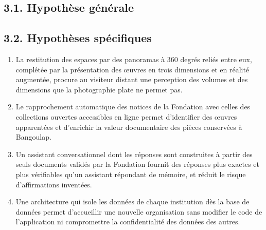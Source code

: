 \subsection*{3.1. Hypothèse générale}


\subsection*{3.2. Hypothèses spécifiques}

\begin{enumerate}
  \item[\textbf{HS1.}] La restitution des espaces par des panoramas à 360 degrés
        reliés entre eux, complétée par la présentation des œuvres en trois
        dimensions et en réalité augmentée, procure au visiteur distant une
        perception des volumes et des dimensions que la photographie plate ne
        permet pas.

  \item[\textbf{HS2.}] Le rapprochement automatique des notices de la Fondation
        avec celles des collections ouvertes accessibles en ligne permet
        d'identifier des œuvres apparentées et d'enrichir la valeur documentaire
        des pièces conservées à Bangoulap.

  \item[\textbf{HS3.}] Un assistant conversationnel dont les réponses sont
        construites à partir des seuls documents validés par la Fondation
        fournit des réponses plus exactes et plus vérifiables qu'un assistant
        répondant de mémoire, et réduit le risque d'affirmations inventées.

  \item[\textbf{HS4.}] Une architecture qui isole les données de chaque
        institution dès la base de données permet d'accueillir une nouvelle
        organisation sans modifier le code de l'application ni compromettre la
        confidentialité des données des autres.
\end{enumerate}

